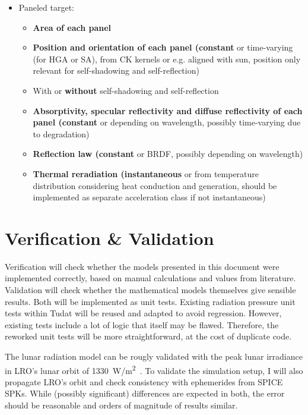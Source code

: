 \documentclass[parskip=full,DIV=15]{scrartcl}
\begin{document}
\begin{itemize}
   \item Paneled target:
   \begin{itemize}
      \item \textbf{Area of each panel}
      \item \textbf{Position and orientation of each panel (constant} or time-varying (for HGA or SA), from CK kernels or e.g. aligned with sun, position only relevant for self-shadowing and self-reflection)
      \item With or \textbf{without} self-shadowing and self-reflection
      \item \textbf{Absorptivity, specular reflectivity and diffuse reflectivity of each panel (constant} or depending on wavelength, possibly time-varying due to degradation)
      \item \textbf{Reflection law (constant} or BRDF, possibly depending on wavelength)
      \item \textbf{Thermal reradiation (instantaneous} or from temperature distribution considering heat conduction and generation, should be implemented as separate acceleration class if not instantaneous)
   \end{itemize}
\end{itemize}







\section{Verification \& Validation}
Verification will check whether the models presented in this document were implemented correctly, based on manual calculations and values from literature. Validation will check whether the mathematical models themselves give sensible results. Both will be implemented as unit tests. Existing radiation pressure unit tests within Tudat will be reused and adapted to avoid regression. However, existing tests include a lot of logic that itself may be flawed. Therefore, the reworked unit tests will be more straightforward, at the cost of duplicate code.

The lunar radiation model can be rougly validated with the peak lunar irradiance in LRO's lunar orbit of \SI{1330}{W/m^2}~\cite{Tooley2010}. To validate the simulation setup, I will also propagate LRO's orbit and check consistency with ephemerides from SPICE SPKs. While (possibly significant) differences are expected in both, the error should be reasonable and orders of magnitude of results similar.
\end{document}
